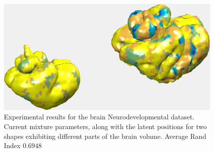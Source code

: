 \documentclass[]{article}
\newcommand{\gD}[2]{\mathcal{N}\left(#1,#2\right)}
\newcommand{\eye}{\mathbf{I}}
\newcommand{\setWv}{\mathbf{W}^{v}}
\newcommand{\setYv}{\mathbf{Y}^{v}}
\newcommand{\setXv}{\mathbf{X}^{v}}
\newcommand{\setZv}{\mathbf{Z}^{v}}
\newcommand{\setFv}{\mathbf{F}^{v}}
\newcommand{\hParams}{\boldsymbol{\theta}}
\begin{document}
\begin{figure}[ht!]
	\centering
	
	\includegraphics[width=0.45\linewidth]{img/brainBaby}
	\caption{Experimental results for the brain Neurodevelopmental dataset.  Current mixture parameters, along with the latent positions for two shapes exhibiting different parts of the brain volume. Average Rand Index $0.6948$ }
	\label{fig:brainBaby}
\end{figure}
%
%
%
%
%
%
%




\end{document}
